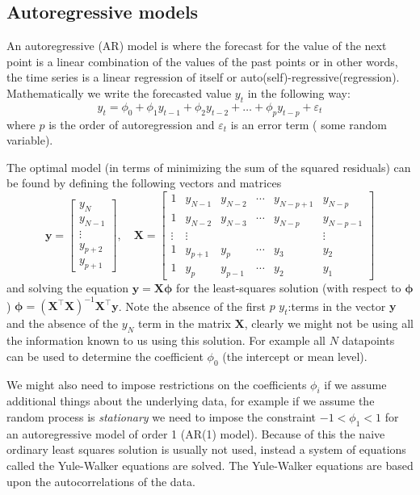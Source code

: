 \documentclass[a4paper, 12pt]{scrartcl}
\begin{document}
\subsection{Autoregressive models}
An autoregressive (AR) model is where the forecast for the value of the next point is a linear combination of the values of the past points or in other words, the time series is a linear regression of itself or auto(self)-regressive(regression).
Mathematically we write the forecasted value $y_t$ in the following way:
\begin{equation*}
	y_t = \phi_0 + \phi_1y_{t-1} + \phi_2y_{t-2}+\dots+\phi_py_{t-p}+\varepsilon_t
\end{equation*}
where $p$ is the order of autoregression and $\varepsilon_t$ is an error term ( some random variable).

The optimal model (in terms of minimizing the sum of the squared residuals) can be found by defining the following vectors and matrices
\begin{equation*}
	\mathbf{y}=\begin{bmatrix}
	y_N\\
	y_{N-1}\\
	\vdots\\
	y_{p+2}\\
	y_{p+1}
	\end{bmatrix},\quad \mathbf{X}=\begin{bmatrix}
	1 & y_{N-1} & y_{N-2} & \cdots & y_{N-p+1}& y_{N-p}\\
	1 & y_{N-2} & y_{N-3} & \cdots & y_{N-p}& y_{N-p-1}\\
	\vdots& \vdots &	  & 	   &		& \vdots\\
	1 & y_{p+1} & y_{p} & \cdots & y_{3}& y_{2}\\
	1 & y_{p} & y_{p-1} & \cdots & y_{2}& y_{1}
	\end{bmatrix}
\end{equation*}
and solving the equation $\mathbf{y}=\mathbf{X}\boldsymbol{\phi}$ for the least-squares solution (with respect to $\boldsymbol{\phi}$) $\boldsymbol{\phi}=\left(\mathbf{X}^\intercal\mathbf{X}\right)^{-1}\mathbf{X}^\intercal\mathbf{y}$.
Note the absence of the first $p$ $y_t$:terms in the vector $\mathbf{y}$ and the absence of the $y_N$ term in the matrix $\mathbf{X}$, clearly we might not be using all the information known to us using this solution.
For example all $N$ datapoints can be used to determine the coefficient $\phi_0$ (the intercept or mean level).

We might also need to impose restrictions on the coefficients $\phi_i$ if we assume additional things about the underlying data, for example if we assume the random process is \emph{stationary} we need to impose the constraint $-1<\phi_1<1$ for an autoregressive model of order 1 (AR(1) model).
Because of this the naive ordinary least squares solution is usually not used, instead a system of equations called the Yule-Walker equations are solved.
The Yule-Walker equations are based upon the autocorrelations of the data.
\end{document}
